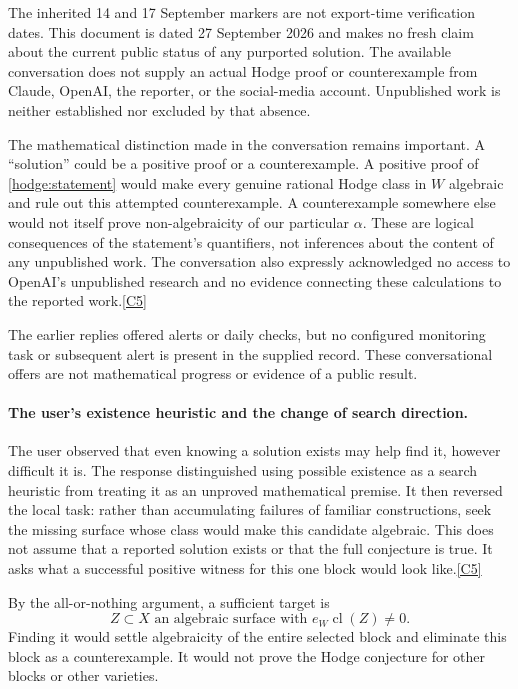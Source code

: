 \documentclass[11pt]{article}
\newcommand{\cl}{\operatorname{cl}}
\newcommand{\src}[1]{\hyperlink{src:#1}{[#1]}}
\begin{document}
The inherited 14 and 17 September markers are not export-time verification
dates. This document is dated 27 September 2026 and makes no fresh claim
about the current public status of any purported solution. The available
conversation does not supply an actual Hodge proof or counterexample from
Claude, OpenAI, the reporter, or the social-media account. Unpublished work
is neither established nor excluded by that absence.

The mathematical distinction made in the conversation remains important.
A ``solution'' could be a positive proof or a counterexample. A positive
proof of \eqref{hodge:statement} would make every genuine rational Hodge
class in $W$ algebraic and rule out this attempted counterexample. A
counterexample somewhere else would not itself prove non-algebraicity of
our particular $\alpha$. These are logical consequences of the statement's
quantifiers, not inferences about the content of any unpublished work.
The conversation also expressly acknowledged no access to OpenAI's
unpublished research and no evidence connecting these calculations to the
reported work.\src{C5}

The earlier replies offered alerts or daily checks, but no configured
monitoring task or subsequent alert is present in the supplied record.
These conversational offers are not mathematical progress or evidence of
a public result.

\paragraph{The user's existence heuristic and the change of search direction.}
The user observed that even knowing a solution exists may help find it,
however difficult it is. The response distinguished using possible
existence as a search heuristic from treating it as an unproved mathematical
premise. It then reversed the local task: rather than accumulating failures
of familiar constructions, seek the missing surface whose class would make
this candidate algebraic. This does not assume that a reported solution
exists or that the full conjecture is true. It asks what a successful
positive witness for this one block would look like.\src{C5}

By the all-or-nothing argument, a sufficient target is
\begin{equation}\label{hodge:positive-witness}
 \boxed{\quad
 Z\subset X\text{ an algebraic surface with }e_W\cl(Z)\ne0.
 \quad}
\end{equation}
Finding it would settle algebraicity of the entire selected block and
eliminate this block as a counterexample. It would not prove the Hodge
conjecture for other blocks or other varieties.
\end{document}
